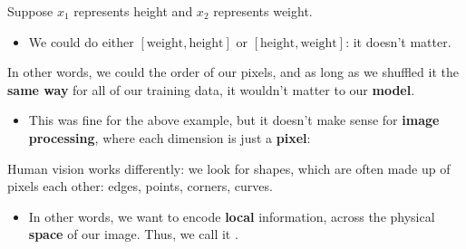         \miniex Suppose $x_1$ represents height and $x_2$ represents weight.
            \begin{itemize}
                \item We could do either $[\text{weight},\text{height}]$ or $[\text{height},\text{weight}]$: it doesn't matter.
            \end{itemize}

        In other words, we could  the order of our pixels, and as long as we shuffled it the \textbf{same way} for all of our training data, it wouldn't matter to our \textbf{model}.

        \begin{itemize}
            \item This was fine for the above example, but it doesn't make sense for \textbf{image processing}, where each dimension is just a \textbf{pixel}:
        \end{itemize}

        Human vision works differently: we look for shapes, which are often made up of pixels  each other: edges, points, corners, curves.

        \phantom{}

        \phantom{}

        \begin{itemize}
            \item In other words, we want to encode \textbf{local} information, across the physical \textbf{space} of our image. Thus, we call it .
                \\
        \end{itemize}

